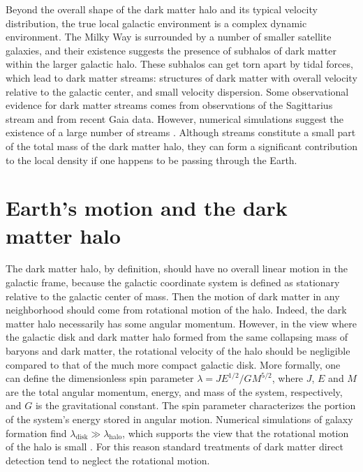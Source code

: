 \documentclass[b5paper, 10pt, twoside]{book}
\begin{document}
Beyond the overall shape of the dark matter halo and its typical velocity distribution, the true local galactic environment is a complex dynamic environment. The Milky Way is surrounded by a number of smaller satellite galaxies, and their existence suggests the presence of subhalos of dark matter within the larger galactic halo. These subhalos can get torn apart by tidal forces, which lead to dark matter streams: structures of dark matter with overall velocity relative to the galactic center, and small velocity dispersion. Some observational evidence for dark matter streams comes from observations of the Sagittarius stream \parencite{BelokurovEtAl2013} and from recent Gaia data\parencite{NecibLisantiBelokurov2019}. However, numerical simulations suggest the existence of a large number of streams \parencite{HelmiWhiteSpringel2002}. Although streams constitute a small part of the total mass of the dark matter halo, they can form a significant contribution to the local density if one happens to be passing through the Earth.

\section{Earth's motion and the dark matter halo}

The dark matter halo, by definition, should have no overall linear motion in the galactic frame, because the galactic coordinate system is defined as stationary relative to the galactic center of mass. Then the motion of dark matter in any neighborhood should come from rotational motion of the halo. Indeed, the dark matter halo necessarily has some angular momentum. However, in the view where the galactic disk and dark matter halo formed from the same collapsing mass of baryons and dark matter, the rotational velocity of the halo should be negligible compared to that of the much more compact galactic disk. More formally, one can define the dimensionless spin parameter $\lambda=JE^{1/2}/GM^{5/2}$, where $J$, $E$ and $M$ are the total angular momentum, energy, and mass of the system, respectively, and $G$ is the gravitational constant. The spin parameter characterizes the portion of the system's energy stored in angular motion. Numerical simulations of galaxy formation find $\lambda_\text{disk}\gg\lambda_\text{halo}$, which supports the view that the rotational motion of the halo is small \parencites{MoMaoWhite1998, WarrenEtAl1992, KimmEtAl2011}. For this reason standard treatments of dark matter direct detection tend to neglect the rotational motion.
\end{document}
